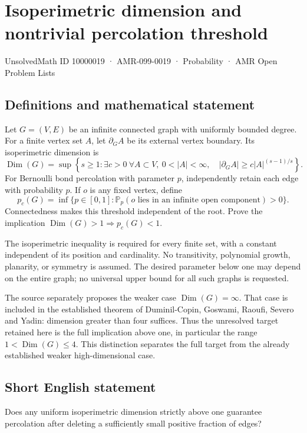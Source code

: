 \documentclass[11pt,a4paper]{article}
\begin{document}
\section*{Isoperimetric dimension and nontrivial percolation threshold}\label{10000019}
{\small UnsolvedMath ID 10000019 · AMR-099-0019 · Probability · AMR Open Problem Lists}
\subsection{Definitions and mathematical statement}
Let $G=(V,E)$ be an infinite connected graph with uniformly bounded degree. For a finite vertex set $A$, let $\partial_G A$ be its external vertex boundary. Its isoperimetric dimension is
\[
\operatorname{Dim}(G)=\sup\left\{s\ge1:\exists c>0\ \forall A\subset V,
\ 0<|A|<\infty,\quad |\partial_G A|\ge c|A|^{(s-1)/s}\right\}.
\]
For Bernoulli bond percolation with parameter $p$, independently retain each edge with probability $p$. If $o$ is any fixed vertex, define
\[
p_c(G)=\inf\{p\in[0,1]:\mathbb P_p(o\text{ lies in an infinite open component})>0\}.
\]
Connectedness makes this threshold independent of the root. Prove the implication $\operatorname{Dim}(G)>1\Longrightarrow p_c(G)<1$.

The isoperimetric inequality is required for every finite set, with a constant independent of its position and cardinality. No transitivity, polynomial growth, planarity, or symmetry is assumed. The desired parameter below one may depend on the entire graph; no universal upper bound for all such graphs is requested.

The source separately proposes the weaker case $\operatorname{Dim}(G)=\infty$. That case is included in the established theorem of Duminil-Copin, Goswami, Raoufi, Severo and Yadin: dimension greater than four suffices. Thus the unresolved target retained here is the full implication above one, in particular the range $1<\operatorname{Dim}(G)\le4$. This distinction separates the full target from the already established weaker high-dimensional case.
\subsection{Short English statement}
Does any uniform isoperimetric dimension strictly above one guarantee percolation after deleting a sufficiently small positive fraction of edges?
\end{document}
